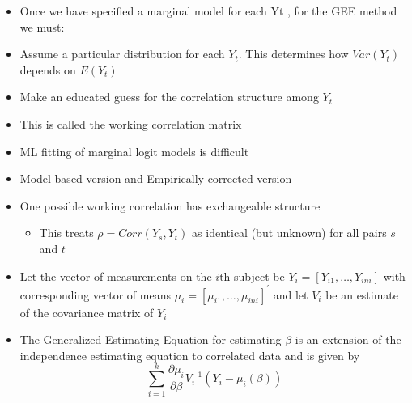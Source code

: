 \documentclass{beamer}
\begin{document}
\begin{frame}
\begin{itemize}
	\item Once we have specified a marginal model for each Yt , for the GEE method we must: \vspace{0.25cm}
	\item Assume a particular distribution for each $Y_t$. This determines how $Var(Y_t)$ depends on $E(Y_t)$ \vspace{0.25cm}
	\item Make an educated guess for the correlation structure among $Y_t$ \vspace{0.25cm}
	\item This is called the working correlation matrix \vspace{0.25cm}
	\item ML fitting of marginal logit models is difficult \vspace{0.25cm}
	\item Model-based version and Empirically-corrected version \vspace{0.25cm}
	\item One possible working correlation has exchangeable structure
	\begin{itemize}
		\item This treats $\rho =Corr(Y_s, Y_t)$ as identical (but unknown) for all pairs $s$ and $t$ 
	\end{itemize}

\end{itemize}
\end{frame}

\begin{frame}{}
\begin{itemize}
	\item Let the vector of measurements on the $i$th subject be $Y_i=[Y_{i1}, \dots,Y_{ini}]$ with corresponding vector of means $\mu_i=[\mu_{i1},\dots,\mu_{ini}]^{'}$ and let $V_i$ be an estimate of the covariance matrix of $Y_i$
	\item The Generalized Estimating  Equation for estimating $\beta$ is an extension of	the independence estimating equation to correlated data and is given by
	\[\sum_{i=1}^{k}\frac{\partial\mu_i}{\partial\beta}V^{-1}_i(Y_i-\mu_i(\beta))\]
\end{itemize}
\end{frame}
\end{document}
